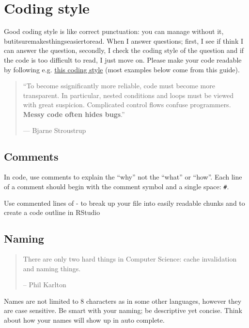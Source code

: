 \documentclass[]{book}
\let\BeginKnitrBlock\begin \let\EndKnitrBlock\end
\begin{document}
\section{Coding style}\label{coding-style}

Good coding style is like correct punctuation: you can manage without
it, butitsuremakesthingseasiertoread. When I answer questions; first, I
see if think I can answer the question, secondly, I check the coding
style of the question and if the code is too difficult to read, I just
move on. Please make your code readable by following e.g.
\href{http://style.tidyverse.org/}{this coding style} (most examples
below come from this guide).

\begin{quote}
``To become ssignificantly more reliable, code must become more
transparent. In particular, nested conditions and loops must be viewed
with great suspicion. Complicated control flows confuse programmers.
\textbf{Messy code often hides bugs}.''

--- Bjarne Stroustrup
\end{quote}

\subsection{Comments}\label{comments}

In code, use comments to explain the ``why'' not the ``what'' or
``how''. Each line of a comment should begin with the comment symbol and
a single space: \texttt{\#}.

\BeginKnitrBlock{rmdtip}
Use commented lines of - to break up your file into easily readable
chunks and to create a code outline in RStudio
\EndKnitrBlock{rmdtip}

\subsection{Naming}\label{naming}

\begin{quote}
There are only two hard things in Computer Science: cache invalidation
and naming things.

-- Phil Karlton
\end{quote}

Names are not limited to 8 characters as in some other languages,
however they are case sensitive. Be smart with your naming; be
descriptive yet concise. Think about how your names will show up in auto
complete.
\end{document}

